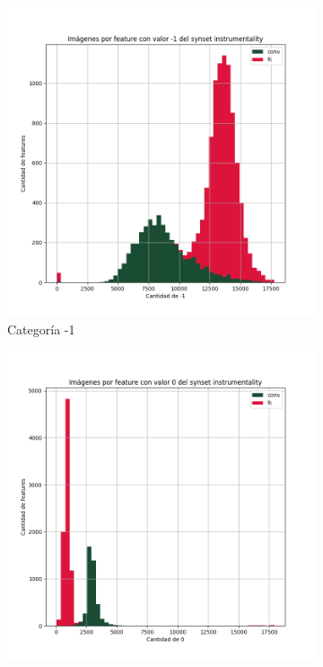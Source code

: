 \documentclass[12,twoside]{TFG-GM}
\theoremstyle{definition}
\theoremstyle{remark}
\begin{document}
\begin{figure}[ht] 
	\centering
	\begin{subfigure}[b]{0.3\textwidth}
		\includegraphics[width=\textwidth] {Images/plots/25/synsets/Images_per_feature_of_-1_category_instrumentalityall_layers.png}
		\caption{Categoría -1}
	\end{subfigure}
	\begin{subfigure}[b]{0.3\textwidth}
		\includegraphics[width=\textwidth]  {Images/plots/25/synsets/Images_per_feature_of_0_category_instrumentalityall_layers.png}

\end{subfigure}
\end{figure}
\end{document}
